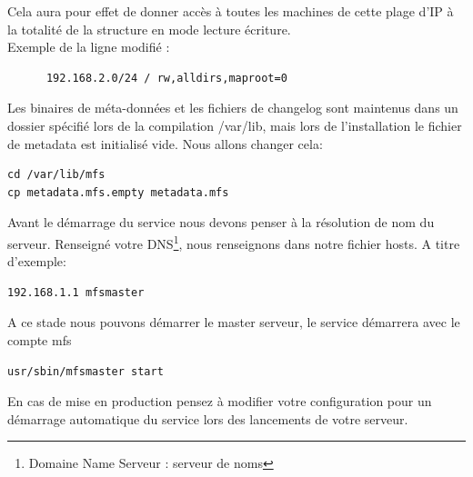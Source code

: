 \documentclass[12pt]{report}
\begin{document}
Cela aura pour effet de donner accès à toutes les machines de cette plage d'IP à la totalité de la structure en mode lecture écriture.\\
Exemple de la ligne modifié :
\begin{lstlisting}
	  192.168.2.0/24 / rw,alldirs,maproot=0
	  \end{lstlisting}
Les binaires de méta-données et les fichiers de changelog sont maintenus dans un dossier spécifié lors de la compilation /var/lib, mais lors de l'installation le fichier de metadata est initialisé vide.
Nous allons changer cela: 
\begin{lstlisting}
cd /var/lib/mfs
cp metadata.mfs.empty metadata.mfs
	  \end{lstlisting}
Avant le démarrage du service nous devons penser à la résolution de nom du serveur. Renseigné votre DNS\footnote{Domaine Name Serveur : serveur de noms}, nous renseignons dans notre fichier hosts.
A titre d'exemple:
  \begin{lstlisting}
192.168.1.1 mfsmaster
	  \end{lstlisting}
A ce stade nous pouvons démarrer le master serveur, le service démarrera avec le compte mfs
  \begin{lstlisting}
usr/sbin/mfsmaster start
	  \end{lstlisting}
En cas de mise en production pensez à modifier votre configuration pour un démarrage automatique du service lors des lancements de votre serveur.
\end{document}
